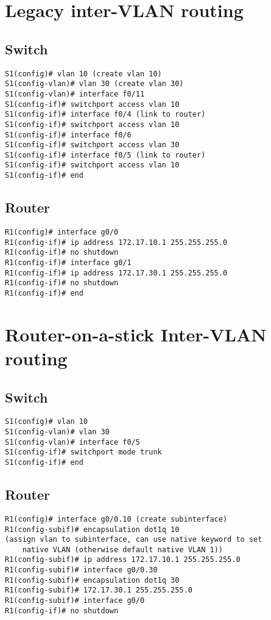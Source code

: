 \documentclass[10pt, a4paper]{article}
\begin{document}
\section{Legacy inter-VLAN routing}
\subsection{Switch}
\begin{lstlisting}
S1(config)# vlan 10 (create vlan 10)
S1(config-vlan)# vlan 30 (create vlan 30)
S1(config-vlan)# interface f0/11
S1(config-if)# switchport access vlan 10
S1(config-if)# interface f0/4 (link to router)
S1(config-if)# switchport access vlan 10
S1(config-if)# interface f0/6
S1(config-if)# switchport access vlan 30
S1(config-if)# interface f0/5 (link to router)
S1(config-if)# switchport access vlan 10
S1(config-if)# end
\end{lstlisting}

\subsection{Router}
\begin{lstlisting}
R1(config)# interface g0/0
R1(config-if)# ip address 172.17.10.1 255.255.255.0
R1(config-if)# no shutdown
R1(config-if)# interface g0/1
R1(config-if)# ip address 172.17.30.1 255.255.255.0
R1(config-if)# no shutdown
R1(config-if)# end
\end{lstlisting}

\section{Router-on-a-stick Inter-VLAN routing}
\subsection{Switch}
\begin{lstlisting}
S1(config)# vlan 10
S1(config-vlan)# vlan 30
S1(config-vlan)# interface f0/5
S1(config-if)# switchport mode trunk
S1(config-if)# end
\end{lstlisting}

\subsection{Router}
\begin{lstlisting}
R1(config)# interface g0/0.10 (create subinterface)
R1(config-subif)# encapsulation dot1q 10
(assign vlan to subinterface, can use native keyword to set
	native VLAN (otherwise default native VLAN 1))
R1(config-subif)# ip address 172.17.10.1 255.255.255.0
R1(config-subif)# interface g0/0.30
R1(config-subif)# encapsulation dot1q 30
R1(config-subif)# 172.17.30.1 255.255.255.0
R1(config-subif)# interface g0/0
R1(config-if)# no shutdown
\end{lstlisting}
\end{document}
